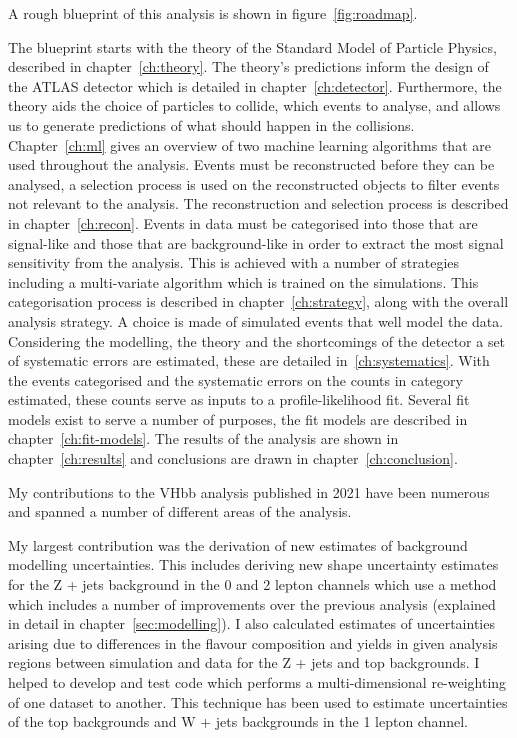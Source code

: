 A rough blueprint of this analysis is shown in figure~\ref{fig:roadmap}.%

The blueprint starts with the theory of the Standard Model of Particle Physics,
described in chapter~\ref{ch:theory}. The theory's predictions inform the
design of the ATLAS detector which is detailed in chapter~\ref{ch:detector}.
Furthermore, the theory aids the choice of particles to collide, which events to
analyse, and allows us to generate predictions of what should happen in the
collisions. Chapter~\ref{ch:ml} gives an overview of two machine learning
algorithms that are used throughout the analysis. Events must be reconstructed
before they can be analysed, a selection process is used on the reconstructed
objects to filter events not relevant to the analysis. The reconstruction and
selection process is described in chapter~\ref{ch:recon}. Events in data must
be categorised into those that are signal-like and those that are
background-like in order to extract the most signal sensitivity from the
analysis. This is achieved with a number of strategies including a multi-variate
algorithm which is trained on the simulations. This categorisation process is
described in chapter~\ref{ch:strategy}, along with the overall analysis
strategy. A choice is made of simulated events that well model the data.
Considering the modelling, the theory and the shortcomings of the detector a set
of systematic errors are estimated, these are detailed in~\ref{ch:systematics}.
With the events categorised and the systematic errors on the counts in category
estimated, these counts serve as inputs to a profile-likelihood fit. Several fit
models exist to serve a number of purposes, the fit models are described in
chapter~\ref{ch:fit-models}. The results of the analysis are shown in
chapter~\ref{ch:results} and conclusions are drawn in
chapter~\ref{ch:conclusion}.


My contributions to the VHbb analysis published in 2021 have been numerous and
spanned a number of different areas of the analysis.

My largest contribution was the derivation of new estimates of background
modelling uncertainties. This includes deriving new shape uncertainty estimates
for the Z + jets background in the 0 and 2 lepton channels which use a method
which includes a number of improvements over the previous analysis (explained in
detail in chapter~\ref{sec:modelling}). I also calculated estimates of
uncertainties arising due to differences in the flavour composition and yields
in given analysis regions between simulation and data for the Z + jets and top
backgrounds. I helped to develop and test code which performs a
multi-dimensional re-weighting of one dataset to another. This technique has
been used to estimate uncertainties of the top backgrounds and W + jets
backgrounds in the 1 lepton channel.

